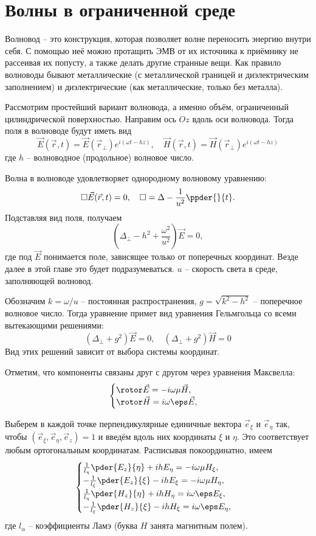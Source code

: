 \chapter{Волны в ограниченной среде}

Волновод -- это конструкция, которая позволяет волне переносить энергию внутри себя. С помощью неё можно протащить ЭМВ от их источника к приёмнику не рассеивая их попусту, а также делать другие странные вещи. Как правило волноводы бывают металлические (с металлической границей и диэлектрическим заполнением) и диэлектрические (как металлические, только без металла).

Рассмотрим простейший вариант волновода, а именно объём, ограниченный цилиндрической поверхностью. Направим ось \( Oz \) вдоль оси волновода. Тогда поля в волноводе будут иметь вид
\[
	\vec{E}(\vec{r}, t) = \vec{E}(\vec{r}_\perp)e^{i(\omega t - hz)},\quad
	\vec{H}(\vec{r}, t) = \vec{H}(\vec{r}_\perp)e^{i(\omega t - hz)}
\]
где \( h \) -- волноводное (продольное) волновое число.

Волна в волноводе удовлетворяет однородному волновому уравнению:
\[
	\square \vec{E}(\vec{r}, t) = 0,\quad \square = \Delta - \frac{1}{u^2}\ppder{}{t}.
\]
Подставляя вид поля, получаем
\[
	(\Delta_\perp - h^2 + \frac{\omega^2}{u^2}) \vec{E} = 0,
\]
где под \( \vec{E} \) понимается поле, зависящее только от поперечных координат. Везде далее в этой главе это будет подразумеваться. \( u \) -- скорость света в среде, заполняющей волновод.

Обозначим \( k = \omega / u \) -- постоянная распространения, \( g = \sqrt{k^2 - h^2} \) -- поперечное волновое число. Тогда уравнение примет вид уравнения Гельмгольца со всеми вытекающими решениями:
\[
	(\Delta_\perp + g^2) \vec{E} = 0, \quad (\Delta_\perp + g^2) \vec{H} = 0
\]
Вид этих решений зависит от выбора системы координат.

Отметим, что компоненты связаны друг с другом через уравнения Максвелла:
\[
	\begin{cases}
		\rotor\vec{E} = -i\omega\mu\vec{H},\\
		\rotor\vec{H} = i\omega\eps\vec{E},
	\end{cases}
\]

Выберем в каждой точке перпендикулярные единичные вектора \( \vec{e}_\xi \) и \( \vec{e}_\eta \) так, чтобы \( (\vec{e}_\xi, \vec{e}_\eta, \vec{e}_z) = 1 \) и введём вдоль них координаты \( \xi \) и \( \eta \). Это соответствует любым ортогональным координатам. Расписывая покоординатно, имеем
\[
	\begin{cases}
		\frac{1}{l_\eta}\pder{E_z}{\eta} + ih E_\eta = -i\omega\mu H_\xi,\\
		-\frac{1}{l_\xi}\pder{E_z}{\xi} - ih E_\xi = -i\omega\mu H_\eta,\\
		\frac{1}{l_\eta}\pder{H_z}{\eta} + ihH_\eta = i\omega\eps E_\xi,\\
		-\frac{1}{l_\xi}\pder{H_z}{\xi} - ihH_\xi = i\omega\eps E_\eta,\\
	\end{cases}
\]
где \( l_\alpha \) -- коэффициенты Ламэ (буква \( H \) занята магнитным полем).

